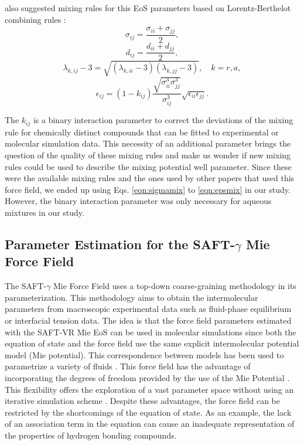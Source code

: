  also suggested mixing rules for this EoS parameters based on Lorentz-Berthelot combining rules \cite{rowlinson}:
\begin{equation}
\sigma_{ij} =\frac{\sigma_{ii}+\sigma_{jj}}{2},
\label{eqn:sigmamix}
\end{equation}
\begin{equation}
d_{ij} =\frac{d_{ii}+d_{jj}}{2},
\label{eqn:dmix}
\end{equation}
\begin{equation}
\lambda_{k,ij} -3 =\sqrt{(\lambda_{k,ii}-3)(\lambda_{k,jj}-3)},  \quad k=r,a,
\label{eqn:lambdamix}
\end{equation}
\begin{equation}
\epsilon_{ij} =(1-k_{ij})\frac{\sqrt{\sigma_{ii}^{3}\sigma_{jj}^{3}}}{\sigma_{ij}^{3}}\sqrt{\epsilon_{ii}\epsilon_{jj}}.
\label{eqn:epsmix}
\end{equation}

The $k_{ij}$ is a binary interaction parameter to correct the deviations of the mixing rule for chemically distinct compounds that can be fitted to experimental or molecular simulation data. This necessity of an additional parameter brings the question of the quality of these mixing rules and make us wonder if new mixing rules could be used to describe the mixing potential well parameter. Since these were the available mixing rules and the ones used by other papers that used this force field, we ended up using Eqs. \ref{eqn:sigmamix} to \ref{eqn:epsmix} in our study. However, the binary interaction parameter was only necessary for aqueous mixtures in our study.  


\subsection{Parameter Estimation for the SAFT-$\gamma$ Mie Force Field}\label{parsaft}

The SAFT-$\gamma$ Mie Force Field uses a top-down coarse-graining methodology in its parameterization. This methodology aims to obtain the intermolecular parameters from macroscopic experimental data such as fluid-phase equilibrium or interfacial tension data. The idea is that the force field parameters estimated with the SAFT-VR Mie EoS can be used in molecular simulations since both the equation of state and the force field use the same explicit intermolecular potential model (Mie potential). This correspondence between models has been used to parametrize a variety of fluids \cite{ervik2016}. This force field has the advantage of incorporating the degrees of freedom provided by the use of the Mie Potential \cite{herdes2015}. This flexibility offers the exploration of a vast parameter space without using an iterative simulation scheme \cite{avendano2011}. Despite these advantages, the force field can be restricted by the shortcomings of the equation of state. As an example, the lack of an association term in the equation can cause an inadequate representation of the properties of hydrogen bonding compounds.


